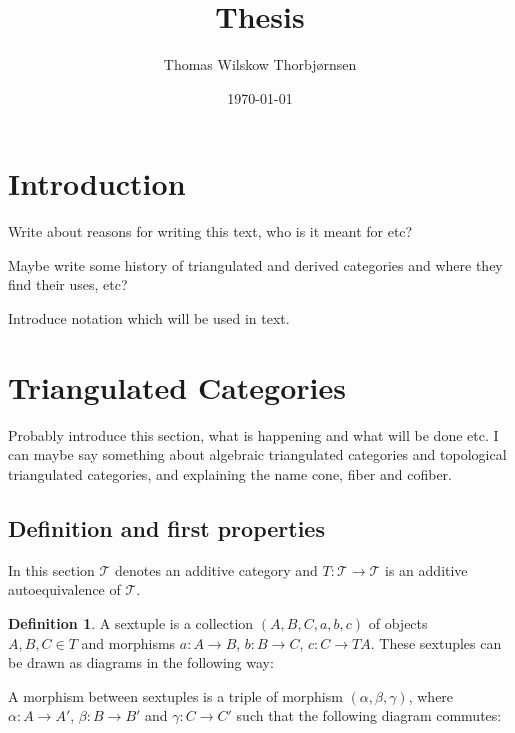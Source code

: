 \documentclass[12pt]{article}
\title{Thesis}
\author{Thomas Wilskow Thorbjørnsen}
\date{\today}
\theoremstyle{definition}
\newtheorem{definition}{Definition}[section]
\theoremstyle{remark}
\begin{document}
    \maketitle
    \section{Introduction}
    
    Write about reasons for writing this text, who is it meant for etc?

    Maybe write some history of triangulated and derived categories and where they find their uses, etc?

    Introduce notation which will be used in text.
    \section{Triangulated Categories}
        Probably introduce this section, what is happening and what will be done etc. I can maybe say something about algebraic triangulated categories and topological triangulated categories, and explaining the name cone, fiber and cofiber.
        \subsection{Definition and first properties}
        In this section $\mathcal{T}$ denotes an additive category and $T:\mathcal{T}\rightarrow\mathcal{T}$ is an additive autoequivalence of $\mathcal{T}$.
        \begin{definition}
            A sextuple is a collection $(A,B,C,a,b,c)$ of objects \\ $A,B,C\in T$ and morphisms $a:A\rightarrow B$, $b:B\rightarrow C$, $c:C\rightarrow TA$. These sextuples can be drawn as diagrams in the following way:

            \begin{center}
            \end{center}

            A morphism between sextuples is a triple of morphism $(\alpha, \beta, \gamma)$, where $\alpha : A \rightarrow A'$, $\beta : B \rightarrow B'$ and $\gamma : C \rightarrow C'$ such that the following diagram commutes:

        \begin{center}
        \end{center}

        \end{definition}
\end{document}
